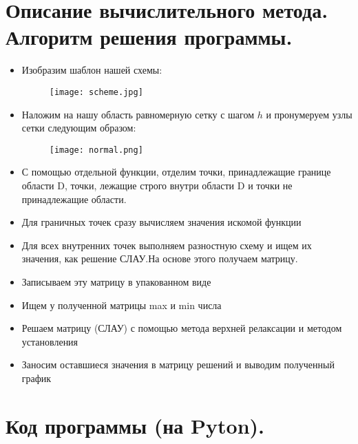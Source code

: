 \documentclass[12pt,a4paper]{scrartcl}
\begin{document}
\newpage

\section{Описание вычислительного метода. Алгоритм решения программы.}
\begin{itemize}
    \item Изобразим шаблон нашей схемы:
        \begin{figure}[h]
            \centering
            \texttt{[image: scheme.jpg]}
        \end{figure}
    \item Наложим на нашу область равномерную сетку с шагом $h$     и пронумеруем узлы сетки следующим образом:
        \begin{figure}[h]
            \centering
            \texttt{[image: normal.png]}
        \end{figure}
    \item С помощью отдельной функции, отделим точки, принадлежащие границе области D, точки, лежащие строго внутри области D и точки не принадлежащие области.  
    \item Для граничных точек сразу вычисляем значения искомой функции
    \item Для всех внутренних точек выполняем разностную схему и ищем их значения, как решение СЛАУ.На основе этого получаем матрицу.
    \item Записываем эту матрицу в упакованном виде
    \item Ищем у полученной матрицы max и min числа
    \item Решаем матрицу (СЛАУ) с помощью метода верхней релаксации и методом установления
    \item Заносим оставшиеся значения в матрицу решений и выводим полученный график
\end{itemize}
\newpage

\section{Код программы (на Pyton).}
	\begin{verbatim}
	
	\end{verbatim}
	
\end{document}
